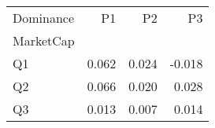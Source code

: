 \begin{tabular}{lrrr}
\toprule
Dominance & P1 & P2 & P3 \\
MarketCap &  &  &  \\
\midrule
Q1 & 0.062 & 0.024 & -0.018 \\
Q2 & 0.066 & 0.020 & 0.028 \\
Q3 & 0.013 & 0.007 & 0.014 \\
\bottomrule
\end{tabular}
